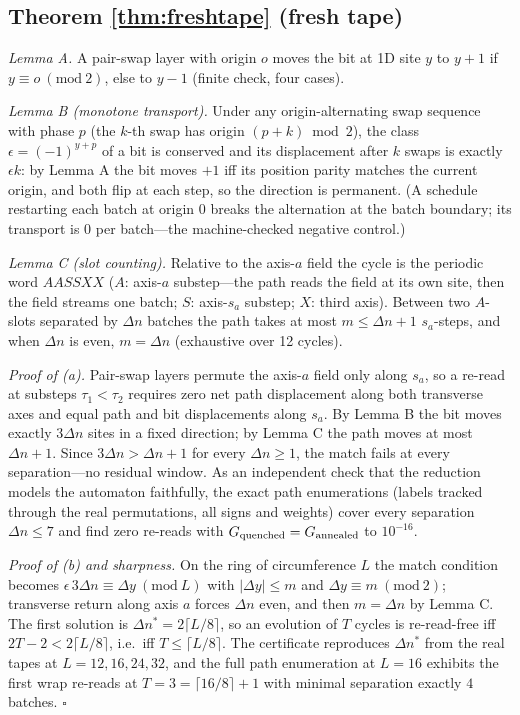 \documentclass[aps,prd,twocolumn,superscriptaddress,nofootinbib,floatfix]{revtex4-2}
\begin{document}
\subsection{Theorem \ref{thm:freshtape} (fresh tape)}

\emph{Lemma A.} A pair-swap layer with origin $o$ moves the bit at 1D
site $y$ to $y+1$ if $y\equiv o\ (\mathrm{mod}\ 2)$, else to $y-1$
(finite check, four cases).

\emph{Lemma B (monotone transport).} Under any origin-alternating swap
sequence with phase $p$ (the $k$-th swap has origin $(p+k)\bmod2$), the
class $\epsilon=(-1)^{y+p}$ of a bit is conserved and its displacement
after $k$ swaps is exactly $\epsilon k$: by Lemma A the bit moves $+1$
iff its position parity matches the current origin, and both flip at
each step, so the direction is permanent. (A schedule restarting each
batch at origin $0$ breaks the alternation at the batch boundary; its
transport is $0$ per batch---the machine-checked negative control.)

\emph{Lemma C (slot counting).} Relative to the axis-$a$ field the
cycle is the periodic word $AASSXX$ ($A$: axis-$a$ substep---the path
reads the field at its own site, then the field streams one batch; $S$:
axis-$s_a$ substep; $X$: third axis). Between two $A$-slots separated
by $\Delta n$ batches the path takes at most $m\le\Delta n+1$
$s_a$-steps, and when $\Delta n$ is even, $m=\Delta n$ (exhaustive over
12 cycles).

\emph{Proof of (a).} Pair-swap layers permute the axis-$a$ field only
along $s_a$, so a re-read at substeps $\tau_1<\tau_2$ requires zero net
path displacement along both transverse axes and equal path and bit
displacements along $s_a$. By Lemma B the bit moves exactly $3\Delta n$
sites in a fixed direction; by Lemma C the path moves at most
$\Delta n+1$. Since $3\Delta n>\Delta n+1$ for every $\Delta n\ge1$,
the match fails at every separation---no residual window. As an
independent check that the reduction models the automaton faithfully,
the exact path enumerations (labels tracked through the real
permutations, all signs and weights) cover every separation
$\Delta n\le7$ and find zero re-reads with
$G_{\rm quenched}=G_{\rm annealed}$ to $10^{-16}$.

\emph{Proof of (b) and sharpness.} On the ring of circumference $L$ the
match condition becomes $\epsilon\,3\Delta n\equiv\Delta y\ (\mathrm{mod}\ L)$
with $|\Delta y|\le m$ and $\Delta y\equiv m\ (\mathrm{mod}\ 2)$;
transverse return along axis $a$ forces $\Delta n$ even, and then
$m=\Delta n$ by Lemma C. The first solution is
$\Delta n^*=2\lceil L/8\rceil$, so an evolution of $T$ cycles is
re-read-free iff $2T-2<2\lceil L/8\rceil$, i.e.\ iff
$T\le\lceil L/8\rceil$. The certificate reproduces $\Delta n^*$ from
the real tapes at $L=12,16,24,32$, and the full path enumeration at
$L=16$ exhibits the first wrap re-reads at $T=3=\lceil16/8\rceil+1$
with minimal separation exactly $4$ batches. \hfill$\square$
\end{document}
